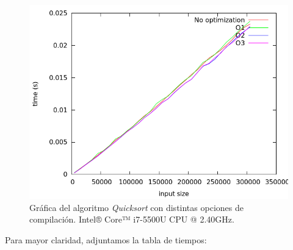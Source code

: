 \documentclass[11pt,a4paper]{article}
\begin{document}
				\begin{figure}[h]

					\centering
					\includegraphics[width=1\textwidth]{quicksort_opt.png}
					\caption{Gráfica del algoritmo \textit{Quicksort} con distintas opciones de compilación. Intel® Core™ i7-5500U CPU @ 2.40GHz.}

				\end{figure}

\newpage

				\par
				Para mayor claridad, adjuntamos la tabla de tiempos:
\end{document}
